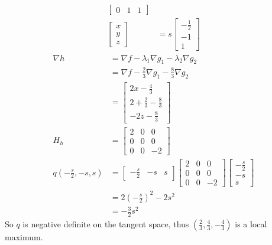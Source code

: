 \documentclass[11pt,letterpaper]{article}
\begin{document}
\begin{enumerate}
\begin{align*}
\begin{bmatrix}
      0 & 1 & 1
    \end{bmatrix} \\
    \begin{bmatrix}x \\ y \\ z\end{bmatrix}
      &= s\begin{bmatrix}
            -\frac{1}{2} \\[0.3em]
            -1 \\
            1
          \end{bmatrix}
  \end{align*}
  \begin{align*}
    \nabla h &= \nabla f-\lambda_1\nabla g_1-\lambda_2\nabla g_2 \\
        &= \nabla f-\frac{2}{3}\nabla g_1-\frac{8}{3}\nabla g_2 \\
        &= \begin{bmatrix}
             2x-\frac{4}{3} \\[0.3em]
             2+\frac{2}{3}-\frac{8}{3} \\[0.3em]
             -2z-\frac{8}{3}
           \end{bmatrix} \\
    H_h &= \begin{bmatrix}
             2 & 0 & 0 \\
             0 & 0 & 0 \\
             0 & 0 & -2
           \end{bmatrix} \\
    q\left(-\frac{s}{2},-s,s\right) &=
        \begin{bmatrix}-\frac{s}{2} & -s & s\end{bmatrix}
        \begin{bmatrix}
          2 & 0 & 0 \\
          0 & 0 & 0 \\
          0 & 0 & -2
        \end{bmatrix}
        \begin{bmatrix}-\frac{s}{2} \\[0.3em] -s \\ s\end{bmatrix} \\
        &= 2\left(-\frac{s}{2}\right)^2-2s^2 \\
        &= -\frac{3}{2}s^2
  \end{align*}
  So $q$ is negative definite on the tangent space, thus
  $\left(\frac{2}{3},\frac{4}{3},-\frac{4}{3}\right)$ is a local maximum.
\end{enumerate}
\end{document}
